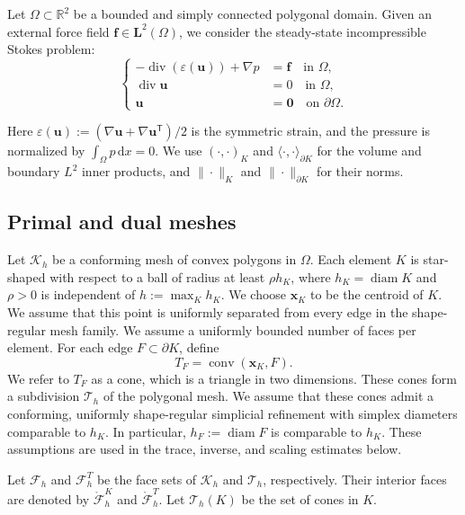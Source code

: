 \documentclass[review,hidelinks,onefignum,onetabnum]{siamart251216}
\begin{document}
Let \(\Omega \subset \mathbb{R}^2\) be a bounded and simply connected polygonal domain. Given an
external force field \(\boldsymbol{f} \in \boldsymbol{L}^2(\Omega)\), we consider the steady-state incompressible Stokes problem:
\begin{equation}\label{eq:stokes}
\left\{
\begin{aligned}
-\operatorname{div}(\varepsilon(\boldsymbol{u})) + \nabla p &= \boldsymbol{f} \quad \text{in } \Omega, \\
\operatorname{div} \boldsymbol{u} &= 0 \quad \text{in } \Omega, \\
\boldsymbol{u} &= \boldsymbol{0} \quad \text{on } \partial\Omega.
\end{aligned}
\right.
\end{equation}


Here $\varepsilon(\boldsymbol u):=(\nabla\boldsymbol u+
\nabla\boldsymbol u^{\mathsf T})/2$ is the symmetric strain, and the pressure
is normalized by $\int_\Omega p\,\mathrm dx=0$. We use $(\cdot,\cdot)_K$ and
$\langle\cdot,\cdot\rangle_{\partial K}$ for the volume and boundary $L^2$
inner products, and $\|\cdot\|_K$ and $\|\cdot\|_{\partial K}$ for their norms.


\subsection{Primal and dual meshes}
Let $\mathcal K_h$ be a conforming mesh of convex polygons in
$\Omega$. Each element $K$ is star-shaped with respect to a ball
of radius at least $\rho h_K$, where $h_K=\operatorname{diam}K$
and $\rho>0$ is independent of $h:=\max_K h_K$. We choose
$\boldsymbol x_K$ to be the centroid of $K$. We assume that this
point is uniformly separated from every edge in the shape-regular
mesh family. We assume a uniformly bounded number of faces per
element. For each edge $F\subset\partial K$, define
\[
T_F=\operatorname{conv}(\boldsymbol x_K,F).
\]
We refer to $T_F$ as a cone, which is a triangle in two
dimensions. These cones form a subdivision $\mathcal T_h$ of the
polygonal mesh.  We assume that these cones admit a conforming,
uniformly shape-regular simplicial refinement with simplex
diameters comparable to $h_K$. In particular,
$h_F:=\operatorname{diam}F$ is comparable to $h_K$. These
assumptions are used in the trace, inverse, and scaling estimates
below.

Let $\mathcal F_h$ and $\mathcal F_h^T$ be the face sets of $\mathcal K_h$
and $\mathcal T_h$, respectively. Their interior faces are denoted by
$\mathring{\mathcal F}_h^K$ and $\mathring{\mathcal F}_h^T$.
Let $\mathcal T_h(K)$ be the set of cones in $K$.
\end{document}

